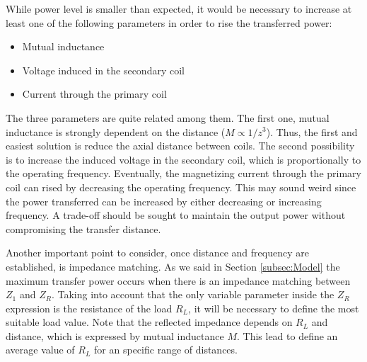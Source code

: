 While power level is smaller than expected, it would be necessary to increase at least one of the following parameters in order to rise the transferred power:
\begin{itemize}[noitemsep] %
	\item Mutual inductance
	\item Voltage induced in the secondary coil
	\item Current through the primary coil 
\end{itemize}

The three parameters are quite related among them. The first one, mutual inductance is strongly dependent on the distance ($M\propto{1/z^3}$). Thus, the first and easiest solution is reduce the axial distance between coils. The second possibility is to increase the induced voltage in the secondary coil, which is proportionally to the operating frequency. Eventually, the magnetizing current through the primary coil can rised by decreasing the operating frequency. This may sound weird since the power transferred can be increased by either decreasing or increasing frequency. A trade-off should be sought to maintain the output power without compromising the transfer distance.

Another important point to consider, once distance and frequency are established, is impedance matching. As we said in Section \ref{subsec:Model} the maximum transfer power occurs when there is an impedance matching between $Z_1$ and $Z_R$. Taking into account that the only variable parameter inside the $Z_R$ expression is the resistance of the load $R_L$, it will be necessary to define the most suitable load value. Note that the reflected impedance depends on $R_L$ and distance, which is expressed by mutual inductance $M$. This lead to define an average value of $R_L$ for an specific range of distances.






